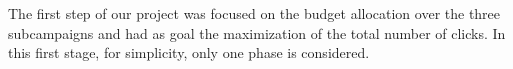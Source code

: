 The first step of our project was focused on the budget allocation over the three subcampaigns and had as goal the maximization of the total number of clicks.
In this first stage, for simplicity, only one phase is considered.